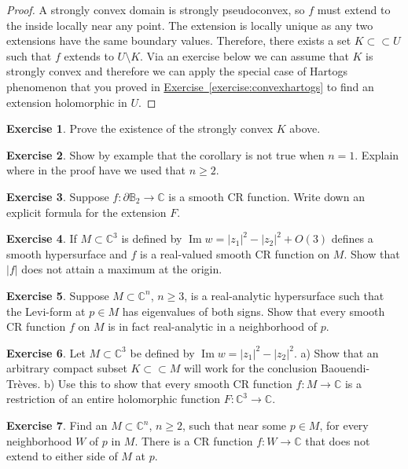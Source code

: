 \documentclass[12pt,openany]{book}
\renewcommand{\Im}{\operatorname{Im}}
\newcommand{\sabs}[1]{\lvert {#1} \rvert}
\newcommand{\C}{{\mathbb{C}}}
\newcommand{\bB}{{\mathbb{B}}}
\theoremstyle{plain}
\theoremstyle{remark}
\theoremstyle{definition}
\newenvironment{exbox}{%
    \def\FrameCommand{\vrule width 1pt \relax\hspace {10pt}}%
    \MakeFramed {\advance \hsize -\width \FrameRestore }%
}{%
    \endMakeFramed
}
\theoremstyle{exercise}
\newtheorem{exercise}{Exercise}[section]
\theoremstyle{example}
\newcommand{\exerciseref}[1]{\hyperref[#1]{Exercise~\ref*{#1}}}
\begin{document}
\begin{proof}
A strongly convex domain is strongly pseudoconvex, so $f$ must extend to the
inside locally near any point.  The extension is locally unique as any two
extensions have the same boundary values.  Therefore, there exists a set
$K \subset \subset U$ such that $f$ extends to $U \setminus K$.
Via an exercise below we can assume that $K$ is strongly convex and
therefore we can apply the special case of Hartogs phenomenon
that you proved in \exerciseref{exercise:convexhartogs} to find an
extension holomorphic in $U$.
\end{proof}

\begin{exbox}
\begin{exercise}
Prove the existence of the strongly convex $K$ above.
\end{exercise}

\begin{exercise}
Show by example that the corollary is not true when $n=1$.  Explain where in
the proof have we used that $n \geq 2$.
\end{exercise}

\begin{exercise}
Suppose $f \colon \partial \bB_2 \to \C$ is a smooth CR function.
Write down an explicit formula for the extension $F$.
\end{exercise}

\begin{exercise}
If $M \subset \C^3$ is defined by $\Im w = \sabs{z_1}^2-\sabs{z_2}^2 + O(3)$
defines a smooth hypersurface and $f$ is a real-valued smooth CR function on $M$.  Show
that $\sabs{f}$ does not attain a maximum at the origin.
\end{exercise}

\begin{exercise}
Suppose $M \subset \C^n$, $n \geq 3$, is a real-analytic hypersurface
such that the Levi-form at $p \in M$ has eigenvalues of both signs.
Show that every smooth CR function $f$ on $M$ is in fact real-analytic in
a neighborhood of $p$.
\end{exercise}

\begin{exercise}
Let $M \subset \C^3$ be defined by $\Im w = \sabs{z_1}^2-\sabs{z_2}^2$.
a) Show that an arbitrary compact subset $K \subset \subset M$ will work
for the conclusion Baouendi-Tr{\`e}ves.  b) Use this to show that every
smooth CR function $f \colon M \to \C$ is a restriction of an entire holomorphic function
$F \colon \C^3 \to \C$.
\end{exercise}

\begin{exercise}
Find an $M \subset \C^n$, $n \geq 2$, such that near some $p \in M$,
for every neighborhood $W$ of $p$ in $M$.  There is a CR function $f \colon
W \to \C$ that does not extend to either side of $M$ at $p$.
\end{exercise}
\end{exbox}
\end{document}
